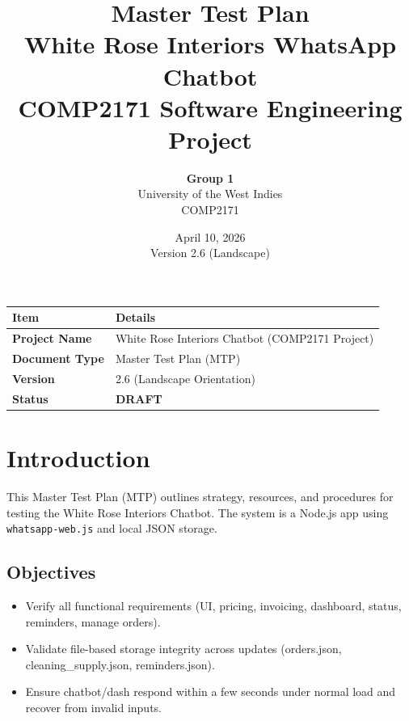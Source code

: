 ﻿\documentclass[11pt, a4paper]{article}
\title{
    \vspace{1cm} %
    \Huge \textbf{Master Test Plan}\\
    \large White Rose Interiors WhatsApp Chatbot\\
    \normalsize COMP2171 Software Engineering Project
    \vspace{0.5cm}
}
\author{\textbf{Group 1} \\ University of the West Indies \\ COMP2171}
\date{April 10, 2026 \\ Version 2.6 (Landscape)}
\begin{document}
\maketitle
\thispagestyle{empty}
\vspace{1cm}

\begin{center}
    \begin{tabular}{|p{}|p{}|}
        \hline
        \rowcolor{lightgray} \textbf{Item} & \textbf{Details} \\
        \hline
        \textbf{Project Name} & White Rose Interiors Chatbot (COMP2171 Project) \\
        \hline
        \textbf{Document Type} & Master Test Plan (MTP) \\
        \hline
        \textbf{Version} & 2.6 (Landscape Orientation) \\
        \hline
        \textbf{Status} & \textbf{DRAFT} \\
        \hline
    \end{tabular}
\end{center}

\newpage
\tableofcontents
\newpage


\section{Introduction}
This Master Test Plan (MTP) outlines strategy, resources, and procedures for testing the White Rose Interiors Chatbot. The system is a Node.js app using \texttt{whatsapp-web.js} and local JSON storage.

\subsection{Objectives}
\begin{itemize}
    \item Verify all functional requirements (UI, pricing, invoicing, dashboard, status, reminders, manage orders).
    \item Validate file-based storage integrity across updates (orders.json, cleaning\_supply.json, reminders.json).
    \item Ensure chatbot/dash respond within a few seconds under normal load and recover from invalid inputs.
\end{itemize}
\end{document}
